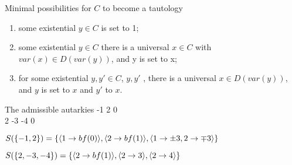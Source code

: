 \documentclass[xcolor=table	]{beamer}
\DeclarePairedDelimiter\ev{\langle}{\rangle}%
\begin{document}
\begin{frame}{Minimal possibilities for $C$ to become a tautology}
    \begin{enumerate}
        \item some existential $y \in C$ is set to 1;
        \item some existential $y \in C$ there is a universal $x \in C$ with $var(x) \in  D(var(y))$, and y is set to x;
        \item for some existential $y, y' \in C$, $y, y'$ , there is a universal $x \in D(var(y))$, and $y$ is set to $x$ and $y'$ to $x$. 
    \end{enumerate}

\begin{exampleblock}{The admissible autarkies}
-1 2 0 \\
2 -3 -4 0 \newline 

$S(\{-1,2 \}) = \{ \ev{1 \to bf(0)}, \ev{2 \to bf(1)}, \ev{1 \to \pm 3, 2 \to  \mp 3} \} $ \newline 

$S(\{2,-3,-4\}) = \{ \ev{2 \to bf(1)}, \ev{2 \to 3}, \ev{2 \to 4} \}$
\end{exampleblock}

\end{frame}
%
%
%
%
%
%
%
\end{document}
